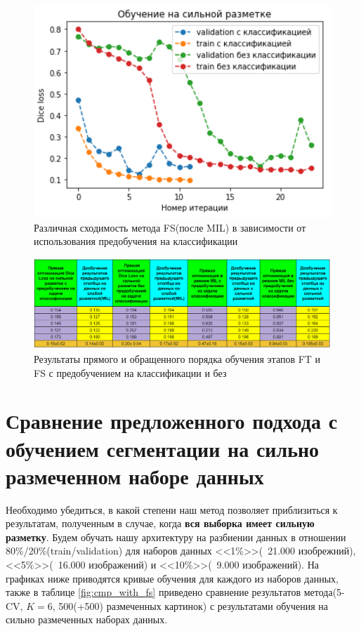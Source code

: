 \begin{figure}[h!] 
  \center
  \includegraphics [scale=0.6] {images/cmp_order_class.png}
  \caption{ Различная сходимость метода FS(после MIL) в зависимости от использования предобучения на классификации }
  \label{fig:cmp_order_class}  
\end{figure}


\begin{figure}[h!] 
  \center
  \includegraphics [scale=0.8] {images/total_table_results.png}
  \caption{ Результаты прямого и обращенного порядка обучения этапов FT и FS с предобучением на классификации и без}
  \label{fig:cmp_order_class}  
\end{figure}

\newpage
\section{Сравнение предложенного подхода с обучением сегментации на сильно размеченном наборе данных}

Необходимо убедиться, в какой степени наш метод позволяет приблизиться к результатам, полученным в случае, когда {\bf вся выборка имеет сильную разметку}. Будем обучать нашу архитектуру на разбиении данных в отношении 80\%/20\%(train/validation) для наборов данных <<1\%>>(~21.000 изобрежний), <<5\%>>(~16.000 изображений) и <<10\%>>(~9.000 изображений). На графиках ниже приводятся кривые обучения для каждого из наборов данных, также в таблице \ref{fig:cmp_with_fs} приведено сравнение результатов метода(5-CV, $K=6$, 500(+500) размеченных картинок) с результатами обучения на сильно размеченных наборах данных.


